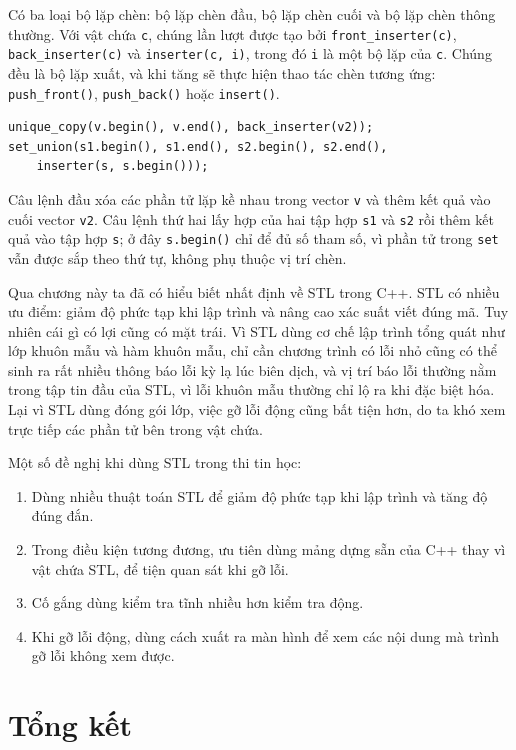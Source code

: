\documentclass[11pt]{article}
\newcommand{\cpp}{C++}
\begin{document}
Có ba loại bộ lặp chèn: bộ lặp chèn đầu, bộ lặp chèn cuối và bộ lặp chèn
thông thường. Với vật chứa \verb|c|, chúng lần lượt được tạo bởi
\verb|front_inserter(c)|, \verb|back_inserter(c)| và \verb|inserter(c, i)|,
trong đó \verb|i| là một bộ lặp của \verb|c|. Chúng đều là bộ lặp xuất, và
khi tăng sẽ thực hiện thao tác chèn tương ứng: \verb|push_front()|,
\verb|push_back()| hoặc \verb|insert()|.

\begin{verbatim}
unique_copy(v.begin(), v.end(), back_inserter(v2));
set_union(s1.begin(), s1.end(), s2.begin(), s2.end(),
    inserter(s, s.begin()));
\end{verbatim}

Câu lệnh đầu xóa các phần tử lặp kề nhau trong vector \verb|v| và thêm kết
quả vào cuối vector \verb|v2|. Câu lệnh thứ hai lấy hợp của hai tập hợp
\verb|s1| và \verb|s2| rồi thêm kết quả vào tập hợp \verb|s|; ở đây
\verb|s.begin()| chỉ để đủ số tham số, vì phần tử trong \verb|set| vẫn được
sắp theo thứ tự, không phụ thuộc vị trí chèn.

Qua chương này ta đã có hiểu biết nhất định về STL trong \cpp{}. STL có nhiều
ưu điểm: giảm độ phức tạp khi lập trình và nâng cao xác suất viết đúng mã.
Tuy nhiên cái gì có lợi cũng có mặt trái. Vì STL dùng cơ chế lập trình tổng
quát như lớp khuôn mẫu và hàm khuôn mẫu, chỉ cần chương trình có lỗi nhỏ cũng
có thể sinh ra rất nhiều thông báo lỗi kỳ lạ lúc biên dịch, và vị trí báo lỗi
thường nằm trong tập tin đầu của STL, vì lỗi khuôn mẫu thường chỉ lộ ra khi
đặc biệt hóa. Lại vì STL dùng đóng gói lớp, việc gỡ lỗi động cũng bất tiện
hơn, do ta khó xem trực tiếp các phần tử bên trong vật chứa.

Một số đề nghị khi dùng STL trong thi tin học:
\begin{enumerate}
  \item Dùng nhiều thuật toán STL để giảm độ phức tạp khi lập trình và tăng
  độ đúng đắn.
  \item Trong điều kiện tương đương, ưu tiên dùng mảng dựng sẵn của \cpp{}
  thay vì vật chứa STL, để tiện quan sát khi gỡ lỗi.
  \item Cố gắng dùng kiểm tra tĩnh nhiều hơn kiểm tra động.
  \item Khi gỡ lỗi động, dùng cách xuất ra màn hình để xem các nội dung mà
  trình gỡ lỗi không xem được.
\end{enumerate}

\section*{Tổng kết}
\end{document}

